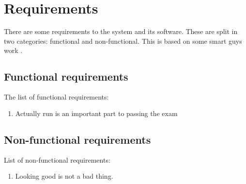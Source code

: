 \section{Requirements}
There are some requirements to the system and its software. These are split in two categories: functional and non-functional. This is based on some smart guys work \cite[citation needed]{keylist}.

\subsection{Functional requirements}
The list of functional requirements:
\begin{enumerate}
	\item Actually run is an important part to passing the exam
\end{enumerate}

\subsection{Non-functional requirements}
List of non-functional requirements:
\begin{enumerate}
	\item Looking good is not a bad thing.
\end{enumerate}
